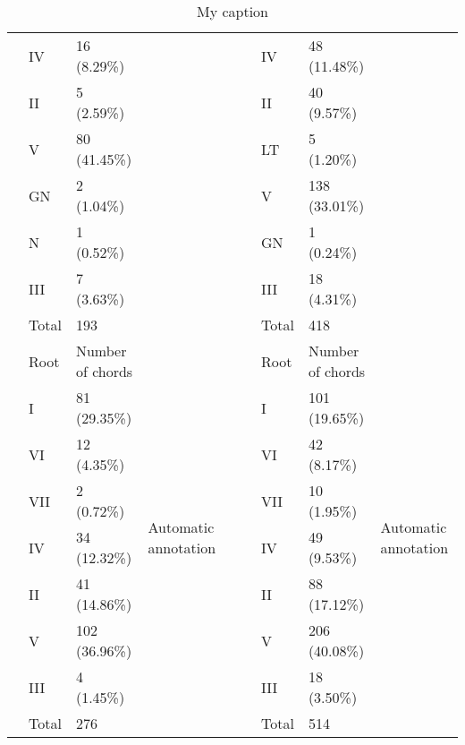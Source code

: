 \begin{table}[]
{\begin{tabular}{lllllllll}
 & IV & 16 (8.29\%) &  &  &  & IV & 48 (11.48\%) &  \\
 & II & 5 (2.59\%) &  &  &  & II & 40 (9.57\%) &  \\
 & V & 80 (41.45\%) &  &  &  & LT & 5 (1.20\%) &  \\
 & GN & 2 (1.04\%) &  &  &  & V & 138 (33.01\%) &  \\
 & N & 1 (0.52\%) &  &  &  & GN & 1 (0.24\%) &  \\
 & III & 7 (3.63\%) &  &  &  & III & 18 (4.31\%) &  \\
 & Total & 193 &  &  &  & Total & 418 &  \\
 & Root & Number of chords & \multirow{9}{*}{Automatic annotation} &  &  & Root & Number of chords & \multirow{9}{*}{Automatic annotation} \\
 & I & 81 (29.35\%) &  &  &  & I & 101 (19.65\%) &  \\
 & VI & 12 (4.35\%) &  &  &  & VI & 42 (8.17\%) &  \\
 & VII & 2 (0.72\%) &  &  &  & VII & 10 (1.95\%) &  \\
 & IV & 34 (12.32\%) &  &  &  & IV & 49 (9.53\%) &  \\
 & II & 41 (14.86\%) &  &  &  & II & 88 (17.12\%) &  \\
 & V & 102 (36.96\%) &  &  &  & V & 206 (40.08\%) &  \\
 & III & 4 (1.45\%) &  &  &  & III & 18 (3.50\%) &  \\
 & Total & 276 &  &  &  & Total & 514 &
\end{tabular}
}
\caption{My caption}
\label{my-label}
\end{table}

\newpage
